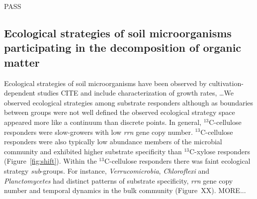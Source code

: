 PASS

\subsection{Ecological strategies of soil microorganisms participating in the
    decomposition of organic matter}
Ecological strategies of soil microorganisms have been observed by
cultivation-dependent studies CITE and include characterization of growth
rates, \ldots  We observed ecological strategies among substrate
responders although as boundaries between groups were not well defined the
observed ecological strategy space appeared more like a continuum than discrete
points. In general, $^{13}$C-cellulose responders were slow-growers with low
\textit{rrn} gene copy number. $^{13}$C-cellulose responders were also
typically low abundance members of the microbial community and exhibited higher
substrate specificity than $^{13}$C-xylose responders (Figure~\ref{fig:shift}).
Within the $^{13}$C-cellulose responders there was faint 
ecological strategy \textit{sub}-groups. For instance,
\textit{Verrucomicrobia}, \textit{Chloroflexi} and \textit{Planctomycetes} had
distinct patterns of substrate specificity, \textit{rrn} gene copy number and
temporal dynamics in the bulk community (Figure~XX). MORE...

